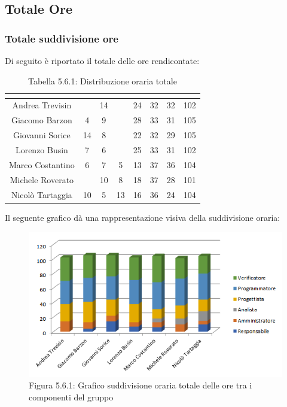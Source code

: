\subsection{Totale Ore}

\subsubsection{Totale suddivisione ore}
Di seguito è riportato il totale delle ore rendicontate:

\renewcommand{\arraystretch}{1.5}
\begin{table}[H]
\begin{center}
\begin{tabular}{|c|c|c|c|c|c|c|c|}
\hline
\rowcolor{title_row}
\textbf{\color{title_text}{Nome}} & \textbf{\color{title_text}{Resp.}} & \textbf{\color{title_text}{Ammi.}} & \textbf{\color{title_text}{Analist.}} & \textbf{\color{title_text}{Progett.}} & \textbf{\color{title_text}{Program.}} & \textbf{\color{title_text}{Verific.}} & \textbf{\color{title_text}{Totale}} \\ \hline
Andrea Trevisin  & & 14 & & 24 & 32 & 32 & 102  \\ \hline
Giacomo Barzon   & 4 & 9 & & 28 & 33 & 31 & 105  \\ \hline
Giovanni Sorice  & 14 & 8 & & 22 & 32 & 29 & 105 \\ \hline
Lorenzo Busin    & 7 & 6 & & 25 & 33 & 31 & 102 \\ \hline
Marco Costantino & 6 & 7 & 5 & 13 & 37 & 36 & 104 \\ \hline
Michele Roverato & & 10 & 8 & 18 & 37 & 28 & 101 \\ \hline
Nicolò Tartaggia & 10 & 5 & 13 & 16 & 36 & 24 & 104  \\ \hline
\end{tabular}
\caption{Tabella 5.6.1: Distribuzione oraria totale\label{}}
\end{center}
\end{table}
\renewcommand{\arraystretch}{1}

Il seguente grafico dà una rappresentazione visiva della suddivisione oraria: \\
\begin{figure} [H]
	\centering
	\includegraphics[scale=1]{Res/ExcelGrafici/Grafici/TotaleOre.png}
	\caption{Figura 5.6.1: Grafico suddivisione oraria totale delle ore tra i componenti del gruppo}\label{}
\end{figure}

